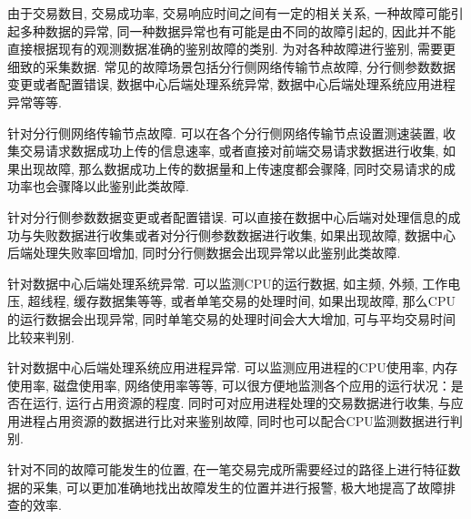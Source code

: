 由于交易数目, 交易成功率, 交易响应时间之间有一定的相关关系, 一种故障可能引起多种数据的异常, 同一种数据异常也有可能是由不同的故障引起的, 因此并不能直接根据现有的观测数据准确的鉴别故障的类别. 为对各种故障进行鉴别, 需要更细致的采集数据. 常见的故障场景包括分行侧网络传输节点故障, 分行侧参数数据变更或者配置错误, 数据中心后端处理系统异常, 数据中心后端处理系统应用进程异常等等.

针对分行侧网络传输节点故障. 可以在各个分行侧网络传输节点设置测速装置, 收集交易请求数据成功上传的信息速率, 或者直接对前端交易请求数据进行收集, 如果出现故障, 那么数据成功上传的数据量和上传速度都会骤降, 同时交易请求的成功率也会骤降以此鉴别此类故障.

针对分行侧参数数据变更或者配置错误. 可以直接在数据中心后端对处理信息的成功与失败数据进行收集或者对分行侧参数数据进行收集, 如果出现故障, 数据中心后端处理失败率回增加, 同时分行侧数据会出现异常以此鉴别此类故障.

针对数据中心后端处理系统异常. 可以监测CPU的运行数据, 如主频, 外频, 工作电压, 超线程, 缓存数据集等等, 或者单笔交易的处理时间, 如果出现故障, 那么CPU的运行数据会出现异常, 同时单笔交易的处理时间会大大增加, 可与平均交易时间比较来判别.

针对数据中心后端处理系统应用进程异常. 可以监测应用进程的CPU使用率, 内存使用率, 磁盘使用率, 网络使用率等等, 可以很方便地监测各个应用的运行状况：是否在运行, 运行占用资源的程度. 同时可对应用进程处理的交易数据进行收集, 与应用进程占用资源的数据进行比对来鉴别故障, 同时也可以配合CPU监测数据进行判别.

针对不同的故障可能发生的位置, 在一笔交易完成所需要经过的路径上进行特征数据的采集, 可以更加准确地找出故障发生的位置并进行报警, 极大地提高了故障排查的效率.
